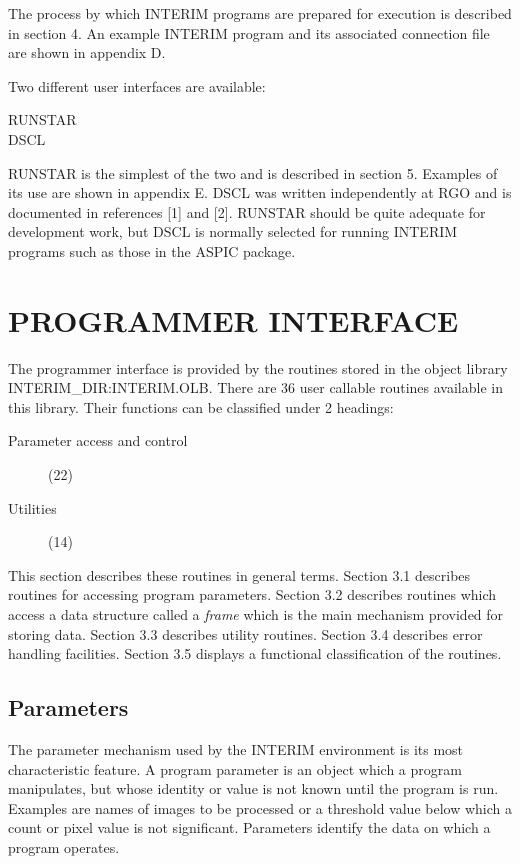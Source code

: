 The process by which INTERIM programs are prepared for execution is described
in section 4.
An example INTERIM program and its associated connection file are shown in
appendix D.

Two different user interfaces are available:
\begin{description}
\begin{description}
\item [RUNSTAR]
\item [DSCL]
\end{description}
\end{description}
RUNSTAR is the simplest of the two and is described in section 5.
Examples of its use are shown in appendix E.
DSCL was written independently at RGO and is documented in references [1] and
[2].
RUNSTAR should be quite adequate for development work, but DSCL is normally
selected for running INTERIM programs such as those in the ASPIC package.
\section {PROGRAMMER INTERFACE}
The programmer interface is provided by the routines stored in the object
library INTERIM\_DIR:\-INTERIM.\-OLB.
There are 36 user callable routines available in this library.
Their functions can be classified under 2 headings:
\begin{description}
\begin{description}
\item [Parameter access and control] (22)
\item [Utilities] (14)
\end{description}
\end{description}
This section describes these routines in general terms.
Section 3.1 describes routines for accessing program parameters.
Section 3.2 describes routines which access a data structure called a
{\em frame} which is the main mechanism provided for storing data.
Section 3.3 describes utility routines.
Section 3.4 describes error handling facilities.
Section 3.5 displays a functional classification of the routines.
\subsection {Parameters}
The parameter mechanism used by the INTERIM environment is its most
characteristic feature.
A program parameter is an object which a program manipulates, but whose
identity or value is not known until the program is run.
Examples are names of images to be processed or a threshold value below
which a count or pixel value is not significant.
Parameters identify the data on which a program operates.

